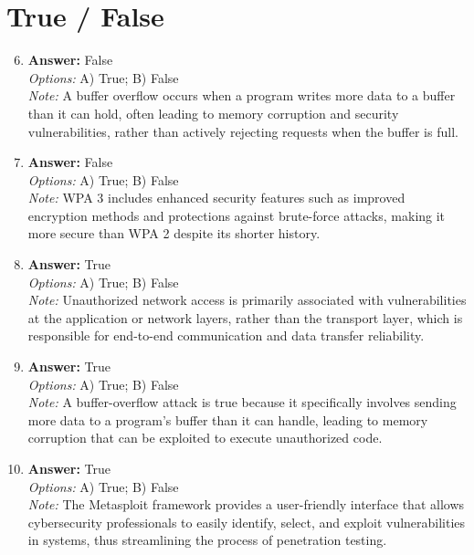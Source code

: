 \documentclass[12pt]{article}
\begin{document}
\section*{True / False}
\begin{enumerate}[label=\arabic*.]
\setcounter{enumi}{5}
\item \textbf{Answer:} False
\\ \textit{Options:} A) True; B) False
\\ \textit{Note:} A buffer overflow occurs when a program writes more data to a buffer than it can hold, often leading to memory corruption and security vulnerabilities, rather than actively rejecting requests when the buffer is full.
\item \textbf{Answer:} False
\\ \textit{Options:} A) True; B) False
\\ \textit{Note:} WPA 3 includes enhanced security features such as improved encryption methods and protections against brute-force attacks, making it more secure than WPA 2 despite its shorter history.
\item \textbf{Answer:} True
\\ \textit{Options:} A) True; B) False
\\ \textit{Note:} Unauthorized network access is primarily associated with vulnerabilities at the application or network layers, rather than the transport layer, which is responsible for end-to-end communication and data transfer reliability.
\item \textbf{Answer:} True
\\ \textit{Options:} A) True; B) False
\\ \textit{Note:} A buffer-overflow attack is true because it specifically involves sending more data to a program's buffer than it can handle, leading to memory corruption that can be exploited to execute unauthorized code.
\item \textbf{Answer:} True
\\ \textit{Options:} A) True; B) False
\\ \textit{Note:} The Metasploit framework provides a user-friendly interface that allows cybersecurity professionals to easily identify, select, and exploit vulnerabilities in systems, thus streamlining the process of penetration testing.
\end{enumerate}
\end{document}
